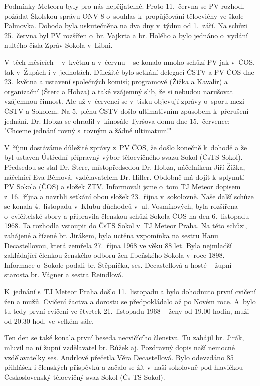 \documentclass[a5paper, 11pt, twoside]{article}
\begin{document}
Podmínky Meteoru byly pro nás nepřijatelné. Proto 11.~června se PV
rozhodl požádat Školskou správu ONV 8 o~souhlas k~propůjčování
tělocvičny ve škole Palmovka. Dohoda byla uskutečněna na dva dny v~týdnu
od 1.~září. Na schůzi 25.~června byl PV rozšířen o~br. Vajkrta a br.
Holého a bylo jednáno o~vydání nultého čísla Zpráv Sokola v~Libni.

V~těch měsících -- v~květnu a v~červnu -- se konalo mnoho schůzí PV jak
v~ČOS, tak v~Župách i v~jednotách. Důležité bylo setkání delegací ČSTV a
PV ČOS dne 23.~května a ustavení společných komisí; programové (Žižka a
Kavalír) a organizační (Šterc a Hobza) a také vzájemný slib, že si
nebudou narušovat vzájemnou činnost. Ale už v~červenci se v~tisku
objevují zprávy o~sporu mezi ČSTV a Sokolem. Na 5. plénu ČSTV došlo
ultimativním způsobem k~přerušení jednání. Dr. Hobza se ohradil
v~kinosále Tyršova domu dne 15.~července: "Chceme jednání rovný s~rovným a
žádné ultimatum!"

V~říjnu dostáváme důležité zprávy z~PV ČOS, že došlo konečně k~dohodě a
že byl ustaven Ústřední přípravný výbor tělocvičného svazu Sokol (ČsTS
Sokol). Předsedou se stal Dr. Šterc, místopředsedou Dr. Hobza,
náčelníkem Jiří Žižka, náčelnicí Eva Bémová, vzdělavatelem Dr. Hiller.
Obdobně má dojít k~splynutí PV Sokola (ČOS) a složek ZTV. Informovali
jsme o~tom TJ Meteor dopisem z~16.~října a navrhli setkání obou složek
23.~října v~sokolovně. Naše další schůze se konala 4.~listopadu v~Klubu
důchodců v~ul. Vosmíkových, byla rozšířena o~cvičitelské sbory a
připravila členskou schůzi Sokola ČOS na den 6.~listopadu 1968. Ta
rozhodla vstoupit do ČsTS Sokol v~TJ Meteor Praha. Na této schůzi,
zahájené a řízené br. Jirákem, byla uctěna vzpomínka na sestru Hanu
Decastellovou, která zemřela 27.~října 1968 ve věku 88 let. Byla
nejmladší zakládající členkou ženského odboru žen libeňského Sokola
v~roce 1898. Informace o~Sokole podali br. Štěpnička, ses. Decastellová a
hosté -- župní starosta br. Vágner a sestra Reindlová.

K~jednání s~TJ Meteor Praha došlo 11.~listopadu a bylo dohodnuto první
cvičení žen a mužů. Cvičení žactva a dorostu se předpokládalo až po
Novém roce. A~bylo tu tedy první cvičení ve čtvrtek 21.~listopadu 1968
-- ženy od 19.00 hodin, muži od 20.30 hod. ve velkém sále.

Ten den se také konala první beseda necvičícího členstva. Tu zahájil br.
Jirák, mluvil na ní župní vzdělavatel br. Růžek aj. Pozdravný dopis naší
nemocné vzdělavatelky ses. Andrlové přečetla Věra Decastellová. Bylo
odevzdáno 85 přihlášek i členských příspěvků a začalo se žít v~naší
sokolovně pod hlavičkou Československý tělocvičný svaz Sokol (Čs TS
Sokol).
\end{document}
